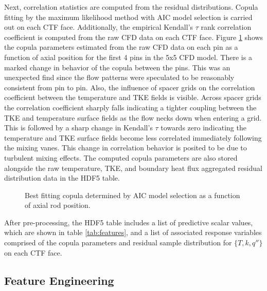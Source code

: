 Next, correlation statistics are computed from the residual distributions.
Copula fitting by the maximum likelihood method with AIC model selection is carried out on each CTF face.  Additionally, the empirical Kendall's $\tau$ rank correlation coefficient is computed from the raw CFD data on each CTF face. Figure \ref{fig:copula_predicted} shows the copula parameters estimated from the raw CFD data on each pin as a function of axial position for the first 4 pins in the 5x5 CFD model.  There is a marked change in behavior of the copula between the pins.  This was an unexpected find since the flow patterns were speculated to be reasonably consistent from pin to pin.  Also, the influence of spacer grids on the correlation coefficient between the temperature and TKE fields is visible.  Across spacer grids the correlation coefficient sharply falls indicating a tighter coupling between the TKE and temperature surface fields as the flow necks down when entering a grid.  This is followed by a sharp change in Kendall's $\tau$ towards zero indicating the temperature and TKE surface fields become less correlated immediately following the mixing vanes.  This change in correlation behavior is posited to be due to turbulent mixing effects.  The computed copula parameters are also stored alongside the raw temperature, TKE, and boundary heat flux aggregated residual distribution data in the HDF5 table.

\begin{figure}[H]%
    \centering
    \qquad
    \qquad
    \qquad
    \qquad
    \caption[Best fitting copula to CFD data.]{Best fitting copula determined by AIC model selection as a function of axial rod position.}%
    \label{fig:copula_predicted}%
\end{figure}

After pre-processing, the HDF5 table includes a list of predictive scalar values, which are shown in table \ref{tab:features}, and a list of associated response variables comprised of the copula parameters and residual sample distribution for $\{T,k,q''\}$ on each CTF face.

\subsection{Feature Engineering}
\label{sec:feature_eng}

